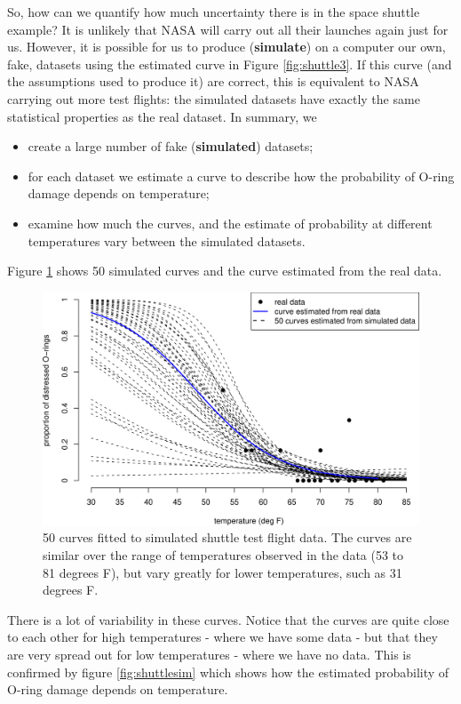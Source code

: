 \documentclass[
  british,
]{book}
\providecommand{\tightlist}{%
  \setlength{\itemsep}{0pt}\setlength{\parskip}{0pt}}
\begin{document}
So, how can we quantify how much uncertainty there is in the space shuttle example? It is unlikely that NASA will carry out all their launches again just for us. However, it is possible for us to produce (\textbf{simulate}) on a computer our own, fake, datasets using the estimated curve in Figure \ref{fig:shuttle3}. If this curve (and the assumptions used to produce it) are correct, this is equivalent to NASA carrying out more test flights: the simulated datasets have exactly the same statistical properties as the real dataset. In summary, we

\begin{itemize}
\tightlist
\item
  create a large number of fake (\textbf{simulated}) datasets;
\item
  for each dataset we estimate a curve to describe how the probability of O-ring damage depends on temperature;
\item
  examine how much the curves, and the estimate of probability at different temperatures vary between the simulated datasets.
\end{itemize}

Figure \ref{fig:shuttlesimcurves} shows 50 simulated curves and the curve estimated from the real data.

\begin{figure}

{\centering \includegraphics[width=0.8\linewidth]{images/shuttle_simcurves} 

}

\caption{50 curves fitted to simulated shuttle test flight data. The curves are similar over the range of temperatures observed in the data (53 to 81 degrees F), but vary greatly for lower temperatures, such as 31 degrees F.}\label{fig:shuttlesimcurves}
\end{figure}

There is a lot of variability in these curves. Notice that the curves are quite close to each other for high temperatures - where we have some data - but that they are very spread out for low temperatures - where we have no data. This is confirmed by figure \ref{fig:shuttlesim} which shows how the estimated probability of O-ring damage depends on temperature.
\end{document}
